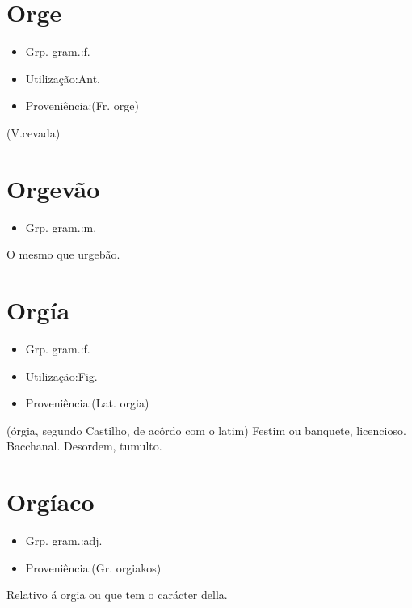 \section{Orge}
\begin{itemize}
\item {Grp. gram.:f.}
\end{itemize}
\begin{itemize}
\item {Utilização:Ant.}
\end{itemize}
\begin{itemize}
\item {Proveniência:(Fr. \textunderscore orge\textunderscore )}
\end{itemize}
(V.cevada)
\section{Orgevão}
\begin{itemize}
\item {Grp. gram.:m.}
\end{itemize}
O mesmo que \textunderscore urgebão\textunderscore .
\section{Orgía}
\begin{itemize}
\item {Grp. gram.:f.}
\end{itemize}
\begin{itemize}
\item {Utilização:Fig.}
\end{itemize}
\begin{itemize}
\item {Proveniência:(Lat. \textunderscore orgia\textunderscore )}
\end{itemize}
(\textunderscore órgia\textunderscore , segundo Castilho, de acôrdo com o latim)
Festim ou banquete, licencioso.
Bacchanal.
Desordem, tumulto.
\section{Orgíaco}
\begin{itemize}
\item {Grp. gram.:adj.}
\end{itemize}
\begin{itemize}
\item {Proveniência:(Gr. \textunderscore orgiakos\textunderscore )}
\end{itemize}
Relativo á orgia ou que tem o carácter della.
